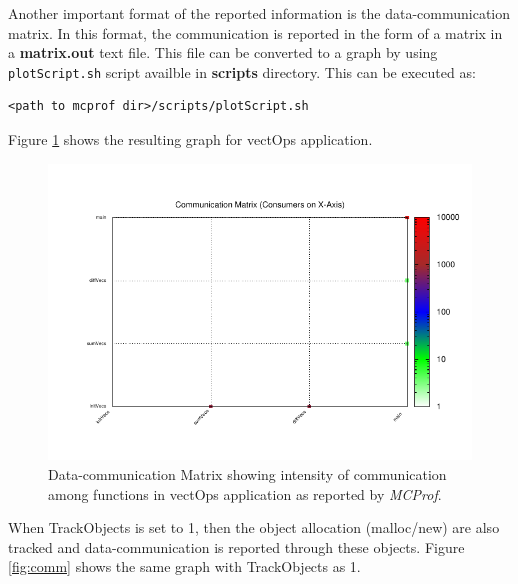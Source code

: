 \documentclass[11pt]{article}
\newcommand{\MCPROF}{\emph{MCProf}}
\begin{document}
Another important format of the reported information is the data-communication
matrix. In this format, the communication is reported in the form of a matrix in
a \textbf{matrix.out} text file.
This file can be converted to a graph by using \verb|plotScript.sh| script
availble in \textbf{scripts} directory. This can be executed as:

{
\small
\begin{Verbatim}[frame=single]
<path to mcprof dir>/scripts/plotScript.sh
\end{Verbatim}
}

Figure \ref{fig:matrix} shows the resulting graph for vectOps application.

\begin{figure}[!h]
\centering
\includegraphics[width=0.95\linewidth]{figures/matrix.pdf}
\caption{Data-communication Matrix showing intensity of communication
    among functions in vectOps application as reported by \MCPROF{}.}
\label{fig:matrix}
\end{figure}


When TrackObjects is set to 1, then the object allocation (malloc/new) are
also tracked and data-communication is reported through these objects. 
Figure \ref{fig:comm} shows the same graph with TrackObjects as 1.
\end{document}
